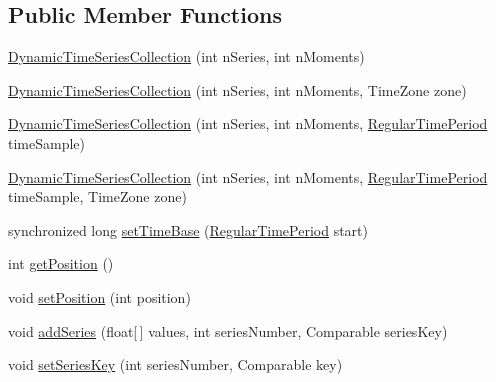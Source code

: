 \subsection*{Public Member Functions}
\begin{DoxyCompactItemize}
\item 
\mbox{\hyperlink{classorg_1_1jfree_1_1data_1_1time_1_1_dynamic_time_series_collection_a394b0423333f069e0085afe6c706e599}{Dynamic\+Time\+Series\+Collection}} (int n\+Series, int n\+Moments)
\item 
\mbox{\hyperlink{classorg_1_1jfree_1_1data_1_1time_1_1_dynamic_time_series_collection_a34781988574ade62ae8ce2bf97538db6}{Dynamic\+Time\+Series\+Collection}} (int n\+Series, int n\+Moments, Time\+Zone zone)
\item 
\mbox{\hyperlink{classorg_1_1jfree_1_1data_1_1time_1_1_dynamic_time_series_collection_ac8825c45c3b3549c27dbbfae9ca817f6}{Dynamic\+Time\+Series\+Collection}} (int n\+Series, int n\+Moments, \mbox{\hyperlink{classorg_1_1jfree_1_1data_1_1time_1_1_regular_time_period}{Regular\+Time\+Period}} time\+Sample)
\item 
\mbox{\hyperlink{classorg_1_1jfree_1_1data_1_1time_1_1_dynamic_time_series_collection_adf161589329e942dca7b1918f3dde4fe}{Dynamic\+Time\+Series\+Collection}} (int n\+Series, int n\+Moments, \mbox{\hyperlink{classorg_1_1jfree_1_1data_1_1time_1_1_regular_time_period}{Regular\+Time\+Period}} time\+Sample, Time\+Zone zone)
\item 
synchronized long \mbox{\hyperlink{classorg_1_1jfree_1_1data_1_1time_1_1_dynamic_time_series_collection_a3f573d0dbae30daea40d586a5f80d367}{set\+Time\+Base}} (\mbox{\hyperlink{classorg_1_1jfree_1_1data_1_1time_1_1_regular_time_period}{Regular\+Time\+Period}} start)
\item 
int \mbox{\hyperlink{classorg_1_1jfree_1_1data_1_1time_1_1_dynamic_time_series_collection_a91be4bef04846e319560bc485c0482f4}{get\+Position}} ()
\item 
void \mbox{\hyperlink{classorg_1_1jfree_1_1data_1_1time_1_1_dynamic_time_series_collection_a96b46efb9a3ddc90fb678ba356e843e6}{set\+Position}} (int position)
\item 
void \mbox{\hyperlink{classorg_1_1jfree_1_1data_1_1time_1_1_dynamic_time_series_collection_ac66d1c2bdd1fdb94e7ed868c501b663e}{add\+Series}} (float\mbox{[}$\,$\mbox{]} values, int series\+Number, Comparable series\+Key)
\item 
void \mbox{\hyperlink{classorg_1_1jfree_1_1data_1_1time_1_1_dynamic_time_series_collection_aed9dbb5d298dd4351486dd0229364222}{set\+Series\+Key}} (int series\+Number, Comparable key)

\end{DoxyCompactItemize}
